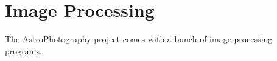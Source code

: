 %
%
%
\chapter{Image Processing\label{chapter:imageprocessing}}
The AstroPhotography project comes with a bunch of image processing
programs.

